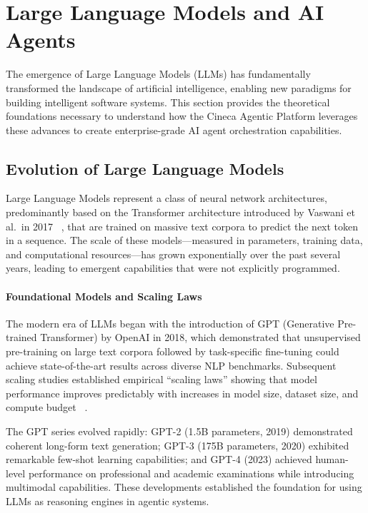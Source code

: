 \documentclass[a4paper,twoside]{sapthesis}
\begin{document}
\section{Large Language Models and AI Agents}
\label{sec:llm-agents}

The emergence of Large Language Models (LLMs) has fundamentally transformed the landscape of artificial intelligence, enabling new paradigms for building intelligent software systems. This section provides the theoretical foundations necessary to understand how the Cineca Agentic Platform leverages these advances to create enterprise-grade AI agent orchestration capabilities.

\subsection{Evolution of Large Language Models}

Large Language Models represent a class of neural network architectures, predominantly based on the Transformer architecture introduced by Vaswani et al.\ in 2017~\cite{vaswani2017attention}
, that are trained on massive text corpora to predict the next token in a sequence. The scale of these models---measured in parameters, training data, and computational resources---has grown exponentially over the past several years, leading to emergent capabilities that were not explicitly programmed.

\paragraph{Foundational Models and Scaling Laws}
The modern era of LLMs began with the introduction of GPT (Generative Pre-trained Transformer) by OpenAI in 2018, which demonstrated that unsupervised pre-training on large text corpora followed by task-specific fine-tuning could achieve state-of-the-art results across diverse NLP benchmarks. Subsequent scaling studies established empirical ``scaling laws'' showing that model performance improves predictably with increases in model size, dataset size, and compute budget~\cite{kaplan2020scaling}
.

The GPT series evolved rapidly: GPT-2 (1.5B parameters, 2019) demonstrated coherent long-form text generation; GPT-3 (175B parameters, 2020) exhibited remarkable few-shot learning capabilities; and GPT-4 (2023) achieved human-level performance on professional and academic examinations while introducing multimodal capabilities. These developments established the foundation for using LLMs as reasoning engines in agentic systems.
\end{document}
